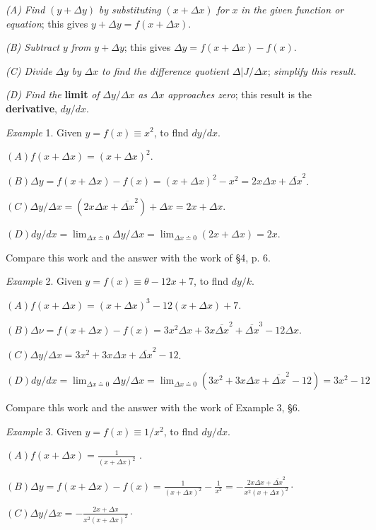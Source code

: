\documentclass[12pt]{article}
\begin{document}
{\it (A) Find} $(y+\Delta y)$ {\it by substituting} $(x+\Delta x)$ 
{\it for} $x$ {\it in the given function or equation}; this gives 
$y+\Delta y=f(x+\Delta x)$.

{\it (B) Subtract} $y$ {\it from} $y+\Delta y$; this gives $\Delta y=f(x+\Delta x)-f(x)$.

{\it (C) Divide} $\Delta y$ {\it by} $\Delta x$ {\it to find the difference quotient} $\Delta|J/\Delta x$; {\it simplify this result}.

{\it (D) Find the} {\bf limit} {\it of} $\Delta y/\Delta x$ {\it as} 
$\Delta x$ {\it approaches zero}; this
result is the {\bf derivative}, $dy/dx$.

{\it Example} 1. Given $y=f(x)\equiv x^{2}$, to flnd $dy/dx$.

$(A) f(x+\Delta x)=(x+\Delta x)^{2}$.

$(B) \Delta y=f(x+\Delta x)-f(x)=(x+\Delta x)^{2}-x^{2}=2x\Delta x+\overline{\Delta x}^{2}$.

$(C) \Delta y/\Delta x=(2x\Delta x+\overline{\Delta x}^{2})+\Delta x=2x+\Delta x$.

$(D) dy/dx = \displaystyle \lim_{\Delta x \doteq 0}\Delta y/\Delta x=\lim_{\Delta x \doteq 0}(2x+\Delta x)=2x$.

Compare this work and the answer with the work of \S 4, p. 6.

{\it Example} 2. Given $y=f(x)\equiv\theta-12x+7$, to flnd $dy/k$.

$(A) f(x+\Delta x) =(x+\Delta x)^3-12(x+\Delta x)+7$.

$(B) \Delta\nu=f(x+\Delta x)-f(x)=3x^{2}\Delta x+3x\overline{\Delta x}^{2}+\overline{\Delta x}^{3}-12\Delta x$.

$(C) \Delta y/\Delta x=3x^{2}+3x\Delta x+\overline{\Delta x}^{2}-12$.

$(D) dy/dx=\displaystyle \lim_{\Delta x \doteq 0}\Delta y/\Delta x=
\lim_{\Delta x \doteq 0}(3x^{2}+3x\Delta x+\overline{\Delta x}^{2}-12)=
3x^{2}-12$

Compare thls work and the answer with the work of Example 3, \S 6.

{\it Example} 3. Given $y=f(x)\equiv 1/x^{2}$, to flnd $dy/dx$.

$(A) f(x+\Delta x)=\frac{1}{(x+\Delta x)^{2}}$ .

$(B) \displaystyle \Delta y=f(x+\Delta x)-f(x)=
\frac{1}{(x+\Delta x)^{2}}-\frac{1}{x^{2}}=
-\frac{2x\Delta x+\overline{\Delta x}^2}{x^{2}(x+\Delta x)^{2}}\cdot$

$(C) \displaystyle \Delta y/\Delta x=-\frac{2x+\Delta x}{x^{2}(x+\Delta x)^{2}}\cdot$
\end{document}
